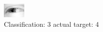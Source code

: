 \begin{figure}[h!]
\begin{center}
\includegraphics[width=0.60\columnwidth]{figures/ID2536_class_3_target_4.png}
\end{center}
\caption{ Classification: 3 actual target: 4}
\label{fig:ID2536_class_3_target_4}
\end{figure}

